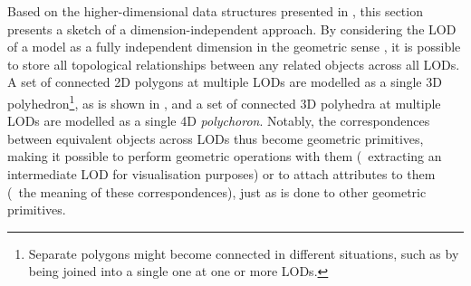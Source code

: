 Based on the higher-dimensional data structures presented in , this section presents a sketch of a dimension-independent approach.
By considering the LOD of a model as a fully independent dimension in the geometric sense \citep{vanOosterom10,Paul11,Stoter12}, it is possible to store all topological relationships between any related objects across all LODs.
A set of connected 2D polygons at multiple LODs are modelled as a single 3D polyhedron\footnote{Separate polygons might become connected in different situations, such as by being joined into a single one at one or more LODs.}, as is shown in , and a set of connected 3D polyhedra at multiple LODs are modelled as a single 4D \emph{polychoron}.
Notably, the correspondences between equivalent objects across LODs thus become geometric primitives, making it possible to perform geometric operations with them (\eg\ extracting an intermediate LOD for visualisation purposes) or to attach attributes to them (\eg\ the meaning of these correspondences), just as is done to other geometric primitives.

